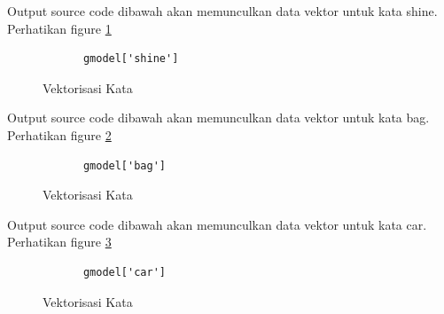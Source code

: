 \begin{enumerate}
Output source code dibawah akan memunculkan data vektor untuk kata shine. Perhatikan figure \ref{YNC5-11}

		\begin{verbatim}
			gmodel['shine']
		\end{verbatim}

		\begin{figure}[ht]
			\caption{Vektorisasi Kata}
			\label{YNC5-11}
		\end{figure}

Output source code dibawah akan memunculkan data vektor untuk kata bag. Perhatikan figure \ref{YNC5-12}

		\begin{verbatim}
			gmodel['bag']
		\end{verbatim}

		\begin{figure}[ht]
			\caption{Vektorisasi Kata}
			\label{YNC5-12}
		\end{figure}

Output source code dibawah akan memunculkan data vektor untuk kata car. Perhatikan figure \ref{YNC5-13}

		\begin{verbatim}
			gmodel['car']
		\end{verbatim}

		\begin{figure}[ht]
			\caption{Vektorisasi Kata}
			\label{YNC5-13}
		\end{figure}


\end{enumerate}
